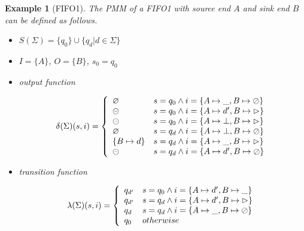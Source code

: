 \documentclass[conference, a4paper]{IEEEtran}
\newtheorem{example}{Example}
\newcommand{\rblock}[0]{\circleddash}
\newcommand{\rread}[0]{\rhd}
\newcommand{\rnoread}[0]{\oslash}
\newcommand{\rempty}[0]{\varnothing}
\begin{document}
\begin{example}[FIFO1]
  \label{example:pmmfifo}
  The PMM of a FIFO1 with source end $A$ and sink end $B$ can be defined as follows.
  \begin{itemize}
    \item[-] $S(\Sigma)=\{q_0\}\cup\{q_d|d\in\Sigma\}$
    \item[-] $I=\{A\}$, $O=\{B\}$, $s_0=q_0$
    \item[-] output function
      \begin{small}
        \begin{displaymath}
          \delta(\Sigma)(s,i)=\left\{
          \begin{array}[ht]{ll}
            \rempty & s=q_0\land i=\{A\mapsto\_,B\mapsto\rnoread\} \\
            \rblock & s=q_0\land i=\{A\mapsto d',B\mapsto\rread\} \\
            \rblock & s=q_0\land i=\{A\mapsto\bot,B\mapsto\rread\} \\
            \rempty & s=q_d\land i=\{A\mapsto\bot,B\mapsto\rnoread\} \\     
            \{B\mapsto d\} & s=q_d\land i=\{A\mapsto\_,B\mapsto\rread\}\\
            \rblock & s=q_d\land i=\{A\mapsto d',B\mapsto \rnoread\} \\
          \end{array}
          \right.
        \end{displaymath}
      \end{small}
    \item[-] transition function
      \begin{small}
        \begin{displaymath}
          \lambda(\Sigma)(s,i)=\left\{
          \begin{array}[ht]{ll}
            q_{d'} & s=q_0\land i=\{A\mapsto d',B\mapsto\_\} \\
            q_{d'} & s=q_{d}\land i=\{A\mapsto d',B\mapsto \rread\} \\
            q_{d} & s=q_{d}\land i=\{A\mapsto \_,B\mapsto \rnoread\} \\
            q_0 & otherwise \\
          \end{array}
          \right.
        \end{displaymath}
      \end{small}
  \end{itemize}
\end{example}
\end{document}
